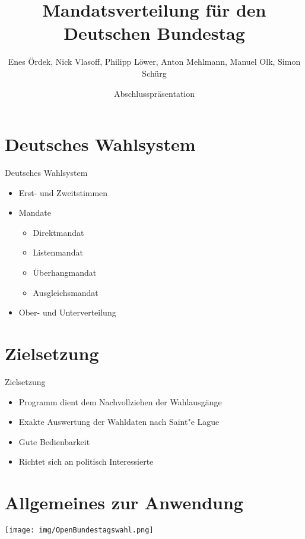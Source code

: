 \documentclass[18pt]{beamer}
\title[OpenBundestagswahl]{Mandatsverteilung für den Deutschen Bundestag}
\subtitle{Enes Ördek, Nick Vlasoff, Philipp Löwer, Anton Mehlmann, Manuel Olk, Simon Schürg}
\author{Abschlusspräsentation}
\institute{Praxis der Softwareentwicklung, WS 2013/14}
\begin{document}

\begin{frame}
\titlepage
\end{frame}



\section{Deutsches Wahlsystem}
\begin{frame}{Deutsches Wahlsystem}
\begin{itemize}
	\item Erst- und Zweitstimmen
	\item Mandate	
	\begin{itemize}
		\item Direktmandat
		\item Listenmandat
		\item Überhangmandat
		\item Ausgleichsmandat
	\end{itemize}
	\item Ober- und Unterverteilung
\end{itemize}
\end{frame}
\section{Zielsetzung}
\begin{frame}{Zielsetzung}
\begin{itemize}
\item Programm dient dem Nachvollziehen der Wahlausgänge
\item Exakte Auswertung der Wahldaten nach Saint"e Lague
\item Gute Bedienbarkeit
\item Richtet sich an politisch Interessierte


\end{itemize}
\end{frame}

\section{Allgemeines zur Anwendung}
\begin{frame}
\begin{center}
	\texttt{[image: img/OpenBundestagswahl.png]}
\end{center}
\end{frame}
\end{document}
